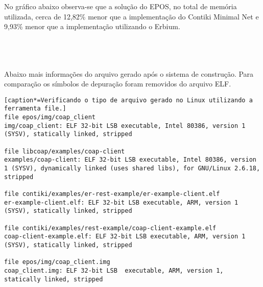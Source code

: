 No gr\'afico abaixo observa-se que a solu\c{c}\~ao do EPOS, no total de mem\'oria utilizada, cerca de 12,82\% menor que a implementa\c{c}\~ao do Contiki Minimal Net e 9,93\% menor que a implementa\c{c}\~ao utilizando o Erbium.
\\\\
\\\\

Abaixo mais informa\c{c}\~oes do arquivo gerado ap\'os o sistema de constru\c{c}\~ao. Para compara\c{c}\~ao os s\'imbolos de depura\c{c}\~ao foram removidos do arquivo ELF.

\begin{lstlisting}[caption*=Verificando o tipo de arquivo gerado no Linux utilizando a ferramenta file.]
file epos/img/coap_client
img/coap_client: ELF 32-bit LSB executable, Intel 80386, version 1 (SYSV), statically linked, stripped

file libcoap/examples/coap-client
examples/coap-client: ELF 32-bit LSB executable, Intel 80386, version 1 (SYSV), dynamically linked (uses shared libs), for GNU/Linux 2.6.18, stripped

file contiki/examples/er-rest-example/er-example-client.elf
er-example-client.elf: ELF 32-bit LSB executable, ARM, version 1 (SYSV), statically linked, stripped

file contiki/examples/rest-example/coap-client-example.elf 
coap-client-example.elf: ELF 32-bit LSB executable, ARM, version 1 (SYSV), statically linked, stripped

file epos/img/coap_client.img 
coap_client.img: ELF 32-bit LSB  executable, ARM, version 1, statically linked, stripped
\end{lstlisting}

